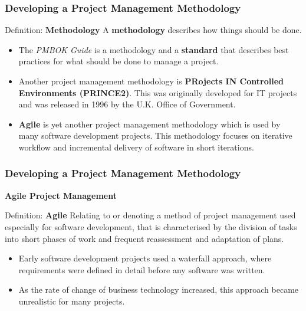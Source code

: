 \documentclass{beamer}
\begin{document}
\begin{frame}
\frametitle{Developing a Project Management Methodology}
\begin{block}{Definition: \textbf{Methodology}}
A \textbf{methodology} describes how things should be done.
\end{block}
\begin{itemize}
\item The \textit{PMBOK Guide} is a methodology  and a \textbf{standard} that describes best practices for what should be done to manage a project.
\item Another project management methodology is \textbf{PRojects IN Controlled Environments (PRINCE2)}. This was originally developed for IT projects and was released in 1996 by the U.K. Office of Government.
\item \textbf{Agile} is yet another project management methodology which is used by many software development projects. This methodology focuses on iterative workflow and incremental delivery of software in short iterations.
\end{itemize}
\end{frame}

\begin{frame}
\frametitle{Developing a Project Management Methodology}
\textbf{Agile Project Management}
\vspace{0.5cm}
\begin{block}{Definition: \textbf{Agile}}
Relating to or denoting a method of project management used especially for software development, that is characterised by the division of tasks into short phases of work and frequent reassessment and adaptation of plans.
\end{block}
\begin{itemize}
\item Early software development projects used a waterfall approach, where requirements were defined in detail before any software was written.
\item As the rate of change of business technology increased, this approach became unrealistic for many projects.
\end{itemize}
\end{frame}
\end{document}
